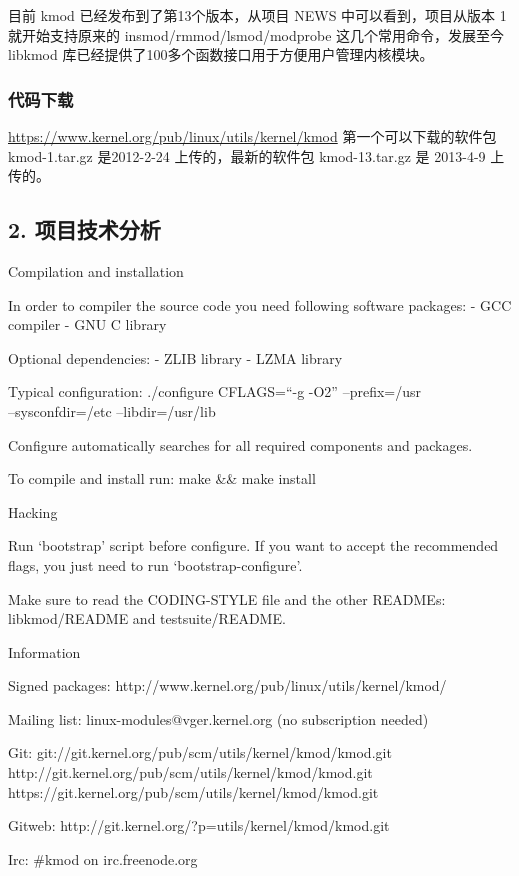 目前 kmod 已经发布到了第13个版本，从项目 NEWS 中可以看到，项目从版本 1
就开始支持原来的 insmod/rmmod/lsmod/modprobe
这几个常用命令，发展至今libkmod
库已经提供了100多个函数接口用于方便用户管理内核模块。

\subsubsection{代码下载}

\url{https://www.kernel.org/pub/linux/utils/kernel/kmod}
第一个可以下载的软件包 kmod-1.tar.gz 是2012-2-24 上传的，最新的软件包
kmod-13.tar.gz 是 2013-4-9 上传的。

\subsection{2. 项目技术分析}

Compilation and installation

In order to compiler the source code you need following software
packages: - GCC compiler - GNU C library

Optional dependencies: - ZLIB library - LZMA library

Typical configuration: ./configure CFLAGS=``-g -O2'' --prefix=/usr \\
--sysconfdir=/etc --libdir=/usr/lib

Configure automatically searches for all required components and
packages.

To compile and install run: make \&\& make install

Hacking

Run `bootstrap' script before configure. If you want to accept the
recommended flags, you just need to run `bootstrap-configure'.

Make sure to read the CODING-STYLE file and the other READMEs:
libkmod/README and testsuite/README.

Information

Signed packages: http://www.kernel.org/pub/linux/utils/kernel/kmod/

Mailing list: linux-modules@vger.kernel.org (no subscription needed)

Git: git://git.kernel.org/pub/scm/utils/kernel/kmod/kmod.git
http://git.kernel.org/pub/scm/utils/kernel/kmod/kmod.git
https://git.kernel.org/pub/scm/utils/kernel/kmod/kmod.git

Gitweb: http://git.kernel.org/?p=utils/kernel/kmod/kmod.git

Irc: \#kmod on irc.freenode.org
